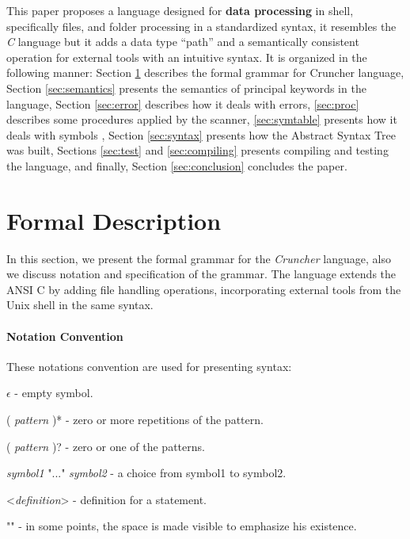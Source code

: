 \documentclass{article}
\begin{document}
This paper proposes a language designed for \textbf{data processing} in shell,
specifically files, and folder processing in a standardized syntax, it
resembles the \textit{C} language but it adds a data type ``path'' and a
semantically consistent operation for external tools with an intuitive syntax.
It is organized in the following manner: Section \ref{sec:formal} describes the
formal grammar for Cruncher language, Section \ref{sec:semantics} presents the
semantics of principal keywords in the language, Section \ref{sec:error}
describes how it deals with errors, \ref{sec:proc} describes some procedures
applied by the scanner, \ref{sec:symtable} presents how it deals with
symbols , Section \ref{sec:syntax} presents how the Abstract Syntax Tree was
built, Sections \ref{sec:test} and \ref{sec:compiling} presents compiling and
testing the language, and finally, Section \ref{sec:conclusion} concludes the
paper.

\section{Formal Description}
\label{sec:formal}
In this section, we present the formal grammar for the \textit{Cruncher}
language, also we discuss notation and specification of the grammar. The
language extends the ANSI C \cite{kernighan2006c} by adding file handling
operations, incorporating external tools from the Unix shell in the same
syntax.

\paragraph{Notation Convention}
These notations convention are used for presenting syntax:

\begin{grammar}
\item $\epsilon$ - empty symbol.

\item ( \textit{pattern} )* - zero or more repetitions of the pattern.

\item ( \textit{pattern} )? - zero or one of the patterns.

\item \textit{symbol1} "..." \textit{symbol2} - a choice from symbol1 to symbol2.

\item <\textit{definition}> - definition for a statement.

\item "\textvisiblespace" - in some points, the space is made visible to
    emphasize his existence.
\end{grammar}
\end{document}
